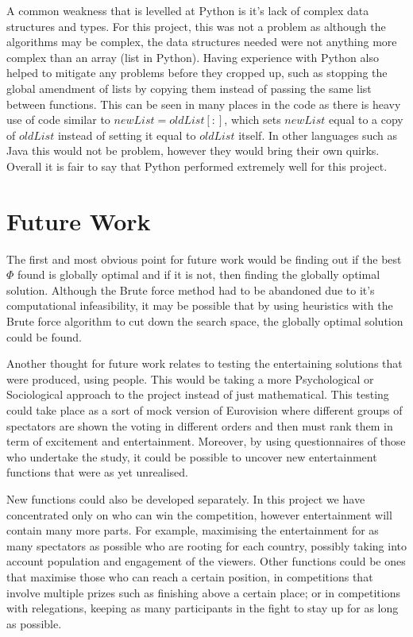 \documentclass[12pt]{report}
\begin{document}
A common weakness that is levelled at Python is it's lack of complex data structures and types. For this project, this was not a problem as although the algorithms may be complex, the data structures needed were not anything more complex than an array (list in Python). Having experience with Python also helped to mitigate any problems before they cropped up, such as stopping the global amendment of lists by copying them instead of passing the same list between functions. This can be seen in many places in the code as there is heavy use of code similar to $newList = oldList[:]$, which sets $newList$ equal to a copy of $oldList$ instead of setting it equal to $oldList$ itself. In other languages such as Java this would not be problem, however they would bring their own quirks. Overall it is fair to say that Python performed extremely well for this project.

\section{Future Work}\label{FutureWork}
The first and most obvious point for future work would be finding out if the best $\Phi$ found is globally optimal and if it is not, then finding the globally optimal solution. Although the Brute force method had to be abandoned due to it's computational infeasibility, it may be possible that by using heuristics with the Brute force algorithm to cut down the search space, the globally optimal solution could be found.

Another thought for future work relates to testing the entertaining solutions that were produced, using people. This would be taking a more Psychological or Sociological approach to the project instead of just mathematical. This testing could take place as a sort of mock version of Eurovision where different groups of spectators are shown the voting in different orders and then must rank them in term of excitement and entertainment. Moreover, by using questionnaires of those who undertake the study, it could be possible to uncover new entertainment functions that were as yet unrealised.

New functions could also be developed separately. In this project we have concentrated only on who can win the competition, however entertainment will contain many more parts. For example, maximising the entertainment for as many spectators as possible who are rooting for each country, possibly taking into account population and engagement of the viewers. Other functions could be ones that maximise those who can reach a certain position, in competitions that involve multiple prizes such as finishing above a certain place; or in competitions with relegations, keeping as many participants in the fight to stay up for as long as possible.
\end{document}
